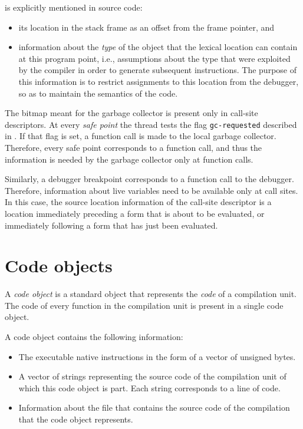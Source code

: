 \begin{itemize}
  is explicitly mentioned in source code:
  \begin{itemize}
  \item its location in the stack frame as an offset from the frame
    pointer, and
  \item information about the \emph{type} of the object that the
    lexical location can contain at this program point, i.e.,
    assumptions about the type that were exploited by the compiler in
    order to generate subsequent instructions.  The purpose of this
    information is to restrict assignments to this location from the
    debugger, so as to maintain the semantics of the code.
  \end{itemize}
\end{itemize}

The bitmap meant for the garbage collector is present only in
call-site descriptors. At every \emph{safe point} the thread tests the
flag \texttt{gc-requested} described in
.
If that flag is set, a function call is made to the local garbage
collector.  Therefore, every safe point corresponds to a function
call, and thus the information is needed by the garbage collector only
at function calls.

Similarly, a debugger breakpoint corresponds to a function call to the
debugger.  Therefore, information about live variables need to be
available only at call sites.  In this case, the source location
information of the call-site descriptor is a location immediately
preceding a form that is about to be evaluated, or immediately
following a form that has just been evaluated.

\section{Code objects}
\label{data-representation-code-objects}

A \emph{code object} is a standard object that represents the
\emph{code} of a compilation unit.  The code of every function in the
compilation unit is present in a single code object.

A code object contains the following information:

\begin{itemize}
\item The executable native instructions in the form of a vector of
  unsigned bytes.
\item A vector of strings representing the source code of the
  compilation unit of which this code object is part.  Each string
  corresponds to a line of code.
\item Information about the file that contains the source code of the
  compilation that the code object represents.
\end{itemize}

